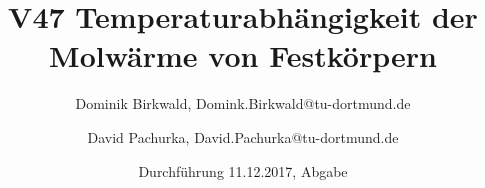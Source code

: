 
\title{V47 Temperaturabhängigkeit der Molwärme von Festkörpern}
\author{Dominik Birkwald, Domink.Birkwald@tu-dortmund.de \and David Pachurka, David.Pachurka@tu-dortmund.de}
\date{Durchführung 11.12.2017, Abgabe }



  \maketitle
  

